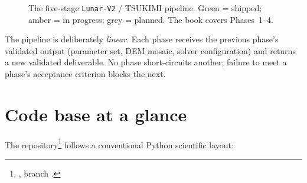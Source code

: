 \begin{figure}[H]
\centering
{}
\caption[Pipeline phase flow]{The five-stage \texttt{Lunar-V2} / TSUKIMI
  pipeline.  Green = shipped; amber = in progress; grey = planned.
  The book covers Phases~1--4.}
\label{fig:pipeline-flow}
\end{figure}

\begin{concept}
The pipeline is deliberately \emph{linear}.  Each phase receives the
previous phase's validated output (parameter set, DEM mosaic, solver
configuration) and returns a new validated deliverable.  No phase
short-circuits another; failure to meet a phase's acceptance criterion
blocks the next.
\end{concept}

\section{Code base at a glance}

The repository\footnote{\repo, branch \branch.} follows a conventional
Python scientific layout:

